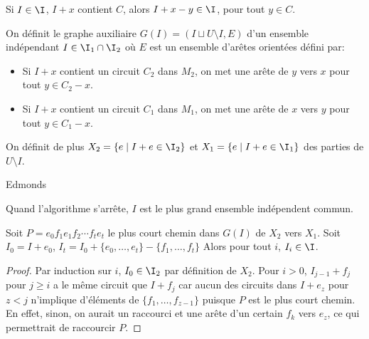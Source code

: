 \documentclass[math, info]{cours}
\begin{document}
\begin{corollaire}
	Si $I \in \I$, $I + x$ contient $C$, alors $I + x - y \in \I$, pour tout $y \in C$.
\end{corollaire}

\begin{definition}
	On définit le graphe auxiliaire $G(I) = \left(I \sqcup U \setminus I, E\right)$ d'un ensemble indépendant $I \in \I_{1} \cap \I_{2}$ où $E$ est un ensemble d'arêtes orientées défini par:
	\begin{itemize}
		\item Si $I + x$ contient un circuit $C_{2}$ dans $M_{2}$, on met une arête de $y$ vers $x$ pour tout $y \in C_{2} - x$.
		\item Si $I +x $ contient un circuit $C_{1}$ dans $M_{1}$, on met une arête de $x$ vers $y$ pour tout $y \in C_{1} - x$.
	\end{itemize}
	On définit de plus $X_{2} = \{e \mid I + e \in \I_{2}\}$ et $X_{1} = \{e \mid I + e\in \I_{1}\}$ des parties de $U \setminus I$.
	\label{def:auxilarygraph}
\end{definition}

\begin{algorithm}
	\caption{Edmonds}
	\begin{algorithmic}
		\EndWhile
	\end{algorithmic}
\end{algorithm}

\begin{thm}
	Quand l'algorithme s'arrête, $I$ est le plus grand ensemble indépendent commun.
\end{thm}

\begin{lemme}
	Soit $P = e_{0}f_{1}e_{1}f_{2}\cdots f_{t}e_{t}$ le plus court chemin dans $G(I)$ de $X_{2}$ vers $X_{1}$.
	Soit $I_{0} = I + e_{0}$, $I_{t} = I_{0} + \{e_{0}, \ldots, e_{t}\} - \{f_{1}, \ldots, f_{t} \}$
	Alors pour tout $i$, $I_{i}\in \I$.
\end{lemme}
\begin{proof}
	Par induction sur $i$, $I_{0} \in \I_{2}$ par définition de $X_{2}$.
	Pour $i > 0$, $I_{j - 1} + f_{j}$ pour $j \geq i$ a le même circuit que $I + f_{j}$ car aucun des circuits dans $I + e_{z}$ pour $z < j$ n'implique d'éléments de $\{f_{1}, \ldots, f_{z - 1}\}$ puisque $P$ est le plus court chemin.
	En effet, sinon, on aurait un raccourci et une arête d'un certain $f_{k}$ vers $e_{z}$, ce qui permettrait de raccourcir $P$.
\end{proof}
\end{document}
